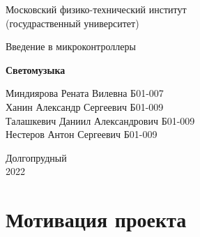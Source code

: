 \documentclass[a4paper, 12pt]{article}%
\begin{document}


\begin{titlepage}

	\newpage
	\begin{center}
		\normalsize Московский физико-технический институт \\(госудраственный 			университет)
	\end{center}

	\vspace{6em}

	\begin{center}
		\Large Введение в микроконтроллеры\\
	\end{center}

	\vspace{1em}

	\begin{center}
		\large \textbf{Светомузыка}
	\end{center}

	\vspace{2em}

	\begin{center}
		\large Миндиярова Рената Вилевна  Б01-007   \\
			Ханин Александр Сергеевич  Б01-009      \\
			Талашкевич Даниил Александрович Б01-009 \\
			Нестеров Антон Сергеевич Б01-009        \\
				
				
	\end{center}

	\vspace{\fill}

	\begin{center}
	Долгопрудный \\2022
	\end{center}
	
\end{titlepage}



	\thispagestyle{empty}
	\newpage
	\tableofcontents
	\newpage
	\setcounter{page}{1}


					
\section{Мотивация проекта}
\end{document}
